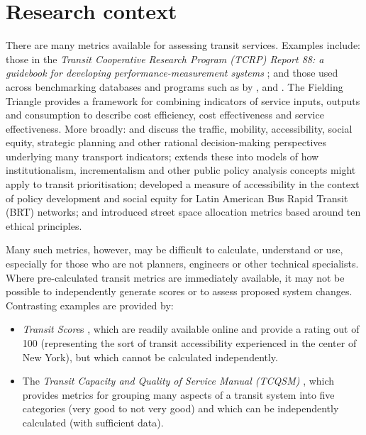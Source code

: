 \documentclass[preprint, 3p,
authoryear]{elsarticle} %
\begin{document}
\section{Research context}\label{research-context}

There are many metrics available for assessing transit services.
Examples include: those in the \emph{Transit Cooperative Research
Program (TCRP) Report 88: a guidebook for developing
performance-measurement systems} \citep{Ryus:2003aa}; and those used
across benchmarking databases and programs such as by
\citet{Florida-Transit-Information-System:2018aa}, \citet{UITP:2015aa}
and \citet{Imperial-College-London:2023aa}. The Fielding Triangle
\citep{FieldingGordonJ1987Mpts} provides a framework for combining
indicators of service inputs, outputs and consumption to describe cost
efficiency, cost effectiveness and service effectiveness. More broadly:
\citet{Litman:2003ab} and \citet{Litman:2016aa} discuss the traffic,
mobility, accessibility, social equity, strategic planning and other
rational decision-making perspectives underlying many transport
indicators; \citet{Reynolds:2017ah} extends these into models of how
institutionalism, incrementalism and other public policy analysis
concepts might apply to transit prioritisation;
\citet{GuzmanLuisA.2017Aeit} developed a measure of accessibility in the
context of policy development and social equity for Latin American Bus
Rapid Transit (BRT) networks; and
\citet{Creutzig2020streetspaceallocation} introduced street space
allocation metrics based around ten ethical principles.

Many such metrics, however, may be difficult to calculate, understand or
use, especially for those who are not planners, engineers or other
technical specialists. Where pre-calculated transit metrics are
immediately available, it may not be possible to independently generate
scores or to assess proposed system changes. Contrasting examples are
provided by:

\begin{itemize}
\item
  \emph{Transit Score}s \citep{WalkScore:2023tg}, which are readily
  available online and provide a rating out of 100 (representing the
  sort of transit accessibility experienced in the center of New York),
  but which cannot be calculated independently.
\item
  The \emph{Transit Capacity and Quality of Service Manual (TCQSM)}
  \citep{TCQSM:2013}, which provides metrics for grouping many aspects
  of a transit system into five categories (very good to not very good)
  and which can be independently calculated (with sufficient data).
\end{itemize}
\end{document}
